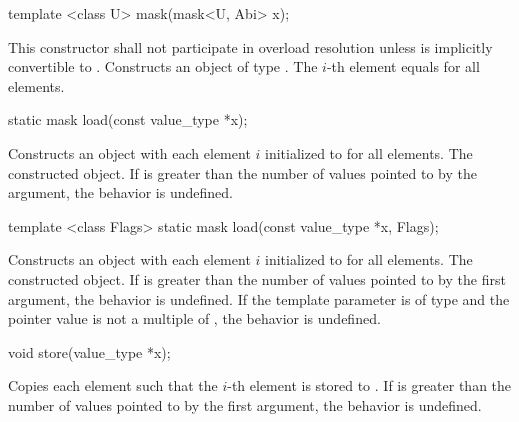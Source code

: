 \begin{wgText}
  \begin{itemdecl}
template <class U> mask(mask<U, Abi> x);
  \end{itemdecl}
  \begin{itemdescr}
    \pnum\remarks This constructor shall not participate in overload resolution unless
      \datapar[<U, Abi>] is implicitly convertible to \datapar[<T, Abi>].
    \pnum\effects Constructs an object of type \mask.
    \pnum\postcondition The $i$-th element equals  for all elements.
  \end{itemdescr}

  \begin{itemdecl}
static mask load(const value_type *x);
  \end{itemdecl}
  \begin{itemdescr}
    \pnum \effects Constructs an object with each element $i$ initialized to  for all elements.
    \pnum \returns The constructed object.
    \pnum \remarks If \mask{} is greater than the number of values pointed to by the argument, the behavior is undefined.
  \end{itemdescr}

  \begin{itemdecl}
template <class Flags> static mask load(const value_type *x, Flags);
  \end{itemdecl}
  \begin{itemdescr}
    \pnum\effects Constructs an object with each element $i$ initialized to  for all elements.
    \pnum\returns The constructed object.
    \pnum\remarks If \mask{} is greater than the number of values pointed to by the first argument, the behavior is undefined.
    \pnum\remarks If the template parameter is of type  and the pointer value is not a multiple of , the behavior is undefined.
  \end{itemdescr}

  \begin{itemdecl}
void store(value_type *x);
  \end{itemdecl}
  \begin{itemdescr}
    \pnum\effects Copies each element such that the $i$-th element is stored to .
    \pnum\remarks If \mask{} is greater than the number of values pointed to by the first argument, the behavior is undefined.
  \end{itemdescr}


\end{wgText}
